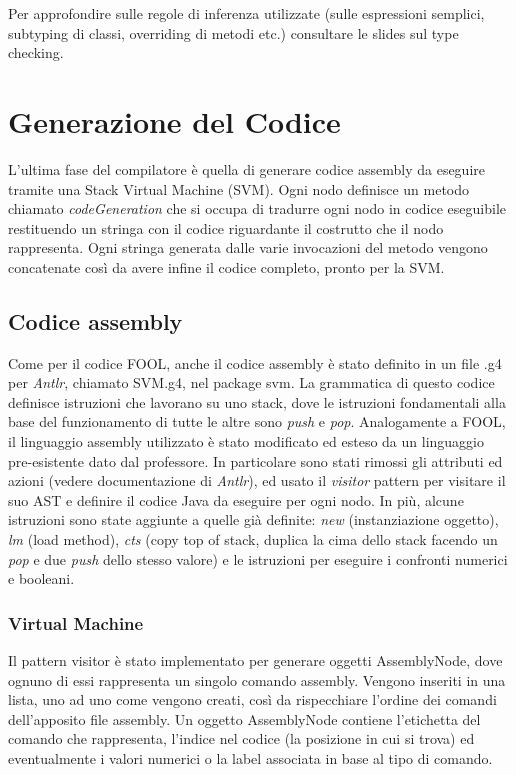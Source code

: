 \documentclass{scrreprt}
\begin{document}
Per approfondire sulle regole di inferenza utilizzate (sulle espressioni semplici, subtyping di classi, overriding di metodi etc.) consultare le slides sul type checking.

\chapter{Generazione del Codice}

L'ultima fase del compilatore è quella di generare codice assembly da eseguire tramite una Stack Virtual Machine (SVM).
Ogni nodo definisce un metodo chiamato \textit{codeGeneration} che si occupa di tradurre ogni nodo in codice eseguibile restituendo un stringa con il codice
riguardante il costrutto che il nodo rappresenta. Ogni stringa generata dalle varie invocazioni del metodo vengono concatenate così da avere infine il codice completo, 
pronto per la SVM. 

\section{Codice assembly}
Come per il codice FOOL, anche il codice assembly è stato definito in un file .g4 per \textit{Antlr}, chiamato SVM.g4, nel package svm. La grammatica di questo codice
definisce istruzioni che lavorano su uno stack, dove le istruzioni fondamentali alla base del funzionamento di tutte le altre sono \textit{push} e \textit{pop}. Analogamente a FOOL, 
il linguaggio assembly utilizzato è stato modificato ed esteso da un linguaggio pre-esistente dato dal professore. In particolare sono stati rimossi gli attributi ed azioni (vedere documentazione di \textit{Antlr}),
ed usato il \textit{visitor} pattern per visitare il suo AST e definire il codice Java da eseguire per ogni nodo. In più, alcune istruzioni sono state aggiunte a quelle già definite: \textit{new} (instanziazione oggetto), \textit{lm} (load method), \textit{cts} (copy top of stack, duplica la cima dello stack facendo un \textit{pop} e due \textit{push} dello stesso valore) e le istruzioni per eseguire
i confronti numerici e booleani.

\subsection{Virtual Machine}
Il pattern visitor è stato implementato per generare oggetti AssemblyNode, dove ognuno di essi rappresenta un singolo comando assembly. Vengono inseriti in una lista, uno ad uno come vengono creati, così da rispecchiare
l'ordine dei comandi dell'apposito file assembly. Un oggetto AssemblyNode contiene l'etichetta del comando che rappresenta, l'indice nel codice (la posizione in cui si trova) ed eventualmente i valori numerici o la label associata in base al tipo di comando.
\end{document}

